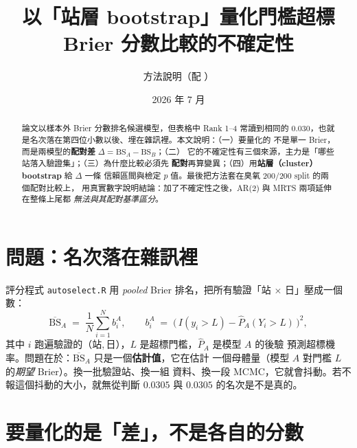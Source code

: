 \documentclass[12pt]{article}
\title{\textbf{以「站層 bootstrap」量化門檻超標\\Brier 分數比較的不確定性}}
\author{方法說明（配 \code{brier\_bootstrap.R}）}
\date{2026 年 7 月}
\newcommand{\BS}{\mathrm{BS}}
\newcommand{\Phat}{\widehat{P}}
\newcommand{\code}[1]{\texttt{#1}}
\begin{document}
\maketitle

\begin{abstract}
論文以樣本外 Brier 分數排名候選模型，但表格中 Rank 1--4 常讀到相同的
$0.030$，也就是名次落在第四位小數以後、埋在雜訊裡。本文說明：（一）要量化的
不是單一 Brier，而是兩模型的\textbf{配對差} $\Delta = \BS_A - \BS_B$；（二）
它的不確定性有三個來源，主力是「哪些站落入驗證集」；（三）為什麼比較必須先
\textbf{配對}再算變異；（四）用\textbf{站層（cluster）bootstrap} 給 $\Delta$ 一條
信賴區間與檢定 $p$ 值。最後把方法套在臭氧 $200/200$ split 的兩個配對比較上，
用真實數字說明結論：加了不確定性之後，AR(2) 與 MRTS 兩項延伸在整條上尾都
\emph{無法與其配對基準區分}。
\end{abstract}

\section{問題：名次落在雜訊裡}

評分程式 \code{autoselect.R} 用 \emph{pooled} Brier 排名，把所有驗證「站
$\times$ 日」壓成一個數：
\begin{equation}
  \overline{\BS}_A \;=\; \frac{1}{N}\sum_{i=1}^{N} b_i^A,
  \qquad
  b_i^A \;=\; \bigl(\,I(y_i > L) - \Phat_A(Y_i > L)\,\bigr)^2 ,
  \label{eq:pooled}
\end{equation}
其中 $i$ 跑遍驗證的（站,\,日），$L$ 是超標門檻，$\Phat_A$ 是模型 $A$ 的後驗
預測超標機率。問題在於：$\overline{\BS}_A$ 只是一個\textbf{估計值}，它在估計
一個母體量（模型 $A$ 對門檻 $L$ 的\emph{期望} Brier）。換一批驗證站、換一組
資料、換一段 MCMC，它就會抖動。若不報這個抖動的大小，就無從判斷
$0.0305$ 與 $0.0305$ 的名次是不是真的。

\section{要量化的是「差」，不是各自的分數}
\end{document}
